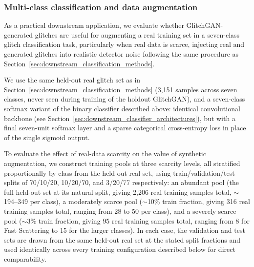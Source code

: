 \documentclass[reprint,nofootinbib,amsmath,amssymb,aps,floatfix]{revtex4-2}
\begin{document}
\subsubsection{Multi-class classification and data augmentation\label{sec:multiclass_methods}}

As a practical downstream application, we evaluate whether GlitchGAN-generated glitches are useful for augmenting a real training set in a seven-class glitch classification task, particularly when real data is scarce, injecting real and generated glitches into realistic detector noise following the same procedure as Section~\ref{sec:downstream_classification_methods}.

We use the same held-out real glitch set as in Section~\ref{sec:downstream_classification_methods} (3{,}151 samples across seven classes, never seen during training of the holdout GlitchGAN), and a seven-class softmax variant of the binary classifier described above: identical convolutional backbone (see Section~\ref{sec:downstream_classifier_architectures}), but with a final seven-unit softmax layer and a sparse categorical cross-entropy loss in place of the single sigmoid output.


To evaluate the effect of real-data scarcity on the value of synthetic augmentation, we construct training pools at three scarcity levels, all stratified proportionally by class from the held-out real set, using train/validation/test splits of 70/10/20, 10/20/70, and 3/20/77 respectively: an abundant pool (the full held-out set at its natural split, giving 2{,}206 real training samples total, $\sim$194--349 per class), a moderately scarce pool ($\sim$10\% train fraction, giving 316 real training samples total, ranging from 28 to 50 per class), and a severely scarce pool ($\sim$3\% train fraction, giving 95 real training samples total, ranging from 8 for Fast Scattering to 15 for the larger classes). In each case, the validation and test sets are drawn from the same held-out real set at the stated split fractions and used identically across every training configuration described below for direct comparability.
\end{document}
